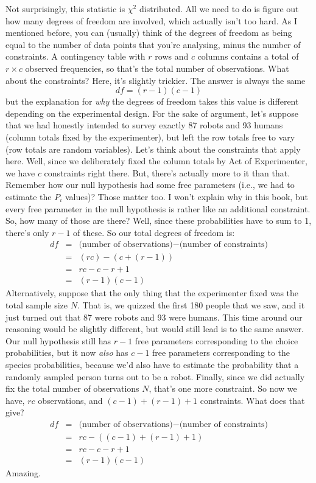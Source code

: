 Not surprisingly, this statistic is $\chi^2$ distributed. All we need to do is figure out how many degrees of freedom are involved, which actually isn't too hard. As I mentioned before, you can (usually) think of the degrees of freedom as being equal to the number of data points that you're analysing, minus the number of constraints. A contingency table with $r$ rows and $c$ columns contains a total of $r \times c$ observed frequencies, so that's the total number of observations. What about the constraints? Here, it's slightly trickier. The answer is always the same
$$
df = (r-1)(c-1)
$$
but the explanation for {\it why} the degrees of freedom takes this value is different depending on the experimental design. For the sake of argument, let's suppose that we had honestly intended to survey exactly 87 robots and 93 humans (column totals fixed by the experimenter), but left the row totals free to vary (row totals are random variables). Let's think about the constraints that apply here. Well, since we deliberately fixed the column totals by Act of Experimenter, we have $c$ constraints right there. But, there's actually more to it than that. Remember how our null hypothesis had some free parameters (i.e., we had to estimate the $P_i$ values)? Those matter too. I won't explain why in this book, but every free parameter in the null hypothesis is rather like an additional constraint. So, how many of those are there? Well, since these probabilities have to sum to 1, there's only $r-1$ of these. So our total degrees of freedom is:
$$
\begin{array}{rcl}
df &=& \mbox{(number of observations)} - \mbox{(number of constraints)} \\
&=& (rc) - (c + (r-1)) \\
&=& rc - c - r + 1 \\
&=& (r - 1)(c - 1)
\end{array}
$$
Alternatively, suppose that the only thing that the experimenter fixed was the total sample size $N$. That is, we quizzed the first 180 people that we saw, and it just turned out that 87 were robots and 93 were humans. This time around our reasoning would be slightly different, but would still lead is to the same answer. Our null hypothesis still has $r-1$ free parameters corresponding to the choice probabilities, but it now {\it also} has $c-1$ free parameters corresponding to the species probabilities, because we'd also have to estimate the probability that a randomly sampled person turns out to be a robot. Finally, since we did actually fix the total number of observations $N$, that's one more constraint. So now we have, $rc$ observations, and $(c-1) + (r-1) + 1$ constraints. What does that give?
$$
\begin{array}{rcl}
df &=& \mbox{(number of observations)} - \mbox{(number of constraints)} \\
&=& rc - ( (c-1) + (r-1) + 1) \\
&=& rc - c - r + 1 \\
&=& (r - 1)(c - 1)
\end{array}
$$
Amazing. 


